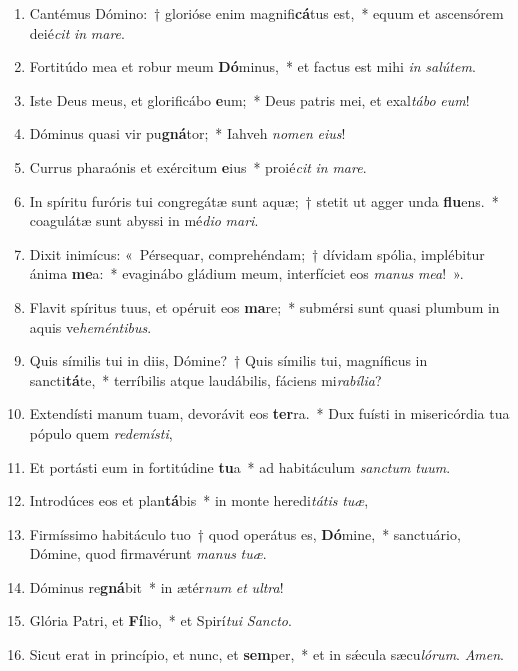 \documentclass[twoside]{article}
\begin{document}
\begin{paracol}[1]{2}
\begin{enumerate}[wide, itemsep=0mm, labelwidth=!, labelindent=0pt, label=\color{gregoriocolor}\theenumi]
\item Cantémus Dómino:~† glorióse enim magnifi\textbf{cá}tus est,~* equum et ascensórem deié\textit{cit} \textit{in} \textit{ma}\textit{re}.
\item Fortitúdo mea et robur meum \textbf{Dó}minus,~* et factus est mihi \textit{in} \textit{sa}\textit{lú}\textit{tem}.
\item Iste Deus meus, et glorificábo \textbf{e}um;~* Deus patris mei, et exal\textit{tá}\textit{bo} \textit{e}\textit{um}!
\item Dóminus quasi vir pu\textbf{gná}tor;~* Iahveh \textit{no}\textit{men} \textit{e}\textit{ius}!
\item Currus pharaónis et exércitum \textbf{e}ius~* proié\textit{cit} \textit{in} \textit{ma}\textit{re}.
\item In spíritu furóris tui congregátæ sunt aquæ;~† stetit ut agger unda \textbf{flu}ens.~* coagulátæ sunt abyssi in mé\textit{di}\textit{o} \textit{ma}\textit{ri}.
\item Dixit inimícus: «~Pérsequar, comprehéndam;~† dívidam spólia, implébitur ánima \textbf{me}a:~* evaginábo gládium meum, interfíciet eos \textit{ma}\textit{nus} \textit{me}\textit{a}!~».
\item Flavit spíritus tuus, et opéruit eos \textbf{ma}re;~* submérsi sunt quasi plumbum in aquis ve\textit{he}\textit{mén}\textit{ti}\textit{bus}.
\item Quis símilis tui in diis, Dómine?~† Quis símilis tui, magníficus in sancti\textbf{tá}te,~* terríbilis atque laudábilis, fáciens mi\textit{ra}\textit{bí}\textit{li}\textit{a}?
\item Extendísti manum tuam, devorávit eos \textbf{ter}ra.~* Dux fuísti in misericórdia tua pópulo quem \textit{red}\textit{e}\textit{mís}\textit{ti},
\item Et portásti eum in fortitúdine \textbf{tu}a~* ad habitáculum \textit{sanc}\textit{tum} \textit{tu}\textit{um}.
\item Introdúces eos et plan\textbf{tá}bis~* in monte heredi\textit{tá}\textit{tis} \textit{tu}\textit{æ},
\item Firmíssimo habitáculo tuo~† quod operátus es, \textbf{Dó}mine,~* sanctuário, Dómine, quod firmavérunt \textit{ma}\textit{nus} \textit{tu}\textit{æ}.
\item Dóminus re\textbf{gná}bit~* in ætér\textit{num} \textit{et} \textit{ul}\textit{tra}!
\item Glória Patri, et \textbf{Fí}lio,~* et Spirí\textit{tu}\textit{i} \textit{Sanc}\textit{to}.
\item Sicut erat in princípio, et nunc, et \textbf{sem}per,~* et in sǽcula sæcu\textit{ló}\textit{rum}. \textit{A}\textit{men}.
\end{enumerate}


\end{paracol}
\end{document}
